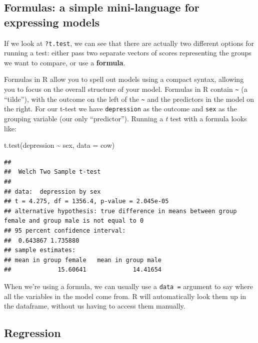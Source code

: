 \documentclass[
]{book}
\newenvironment{Shaded}{\begin{snugshade}}{\end{snugshade}}
\newcommand{\AttributeTok}[1]{\textcolor[rgb]{0.77,0.63,0.00}{#1}}
\newcommand{\FunctionTok}[1]{\textcolor[rgb]{0.00,0.00,0.00}{#1}}
\newcommand{\NormalTok}[1]{#1}
\newcommand{\SpecialCharTok}[1]{\textcolor[rgb]{0.00,0.00,0.00}{#1}}
\begin{document}
\hypertarget{formulas-a-simple-mini-language-for-expressing-models}{%
\subsection{Formulas: a simple mini-language for expressing models}\label{formulas-a-simple-mini-language-for-expressing-models}}

If we look at \texttt{?t.test}, we can see that there are actually
two different options for running a test: either pass two separate
vectors of scores representing the groups we want to compare,
or use a \textbf{formula}.

Formulas in R allow you to spell out models using a compact syntax,
allowing you to focus on the overall structure of your model. Formulas
in R contain \texttt{\textasciitilde{}} (a ``tilde''), with the outcome on the left of the \texttt{\textasciitilde{}} and
the predictors in the model on the right. For our t-test we have
\texttt{depression} as the outcome and \texttt{sex} as the grouping variable (our only
``predictor''). Running a \emph{t} test with a formula looks like:

\begin{Shaded}
\begin{Highlighting}[]
\FunctionTok{t.test}\NormalTok{(depression }\SpecialCharTok{\textasciitilde{}}\NormalTok{ sex, }\AttributeTok{data =}\NormalTok{ cow)}
\end{Highlighting}
\end{Shaded}

\begin{verbatim}
## 
##  Welch Two Sample t-test
## 
## data:  depression by sex
## t = 4.275, df = 1356.4, p-value = 2.045e-05
## alternative hypothesis: true difference in means between group female and group male is not equal to 0
## 95 percent confidence interval:
##  0.643867 1.735880
## sample estimates:
## mean in group female   mean in group male 
##             15.60641             14.41654
\end{verbatim}

When we're using a formula, we can usually use a \texttt{data\ =} argument
to say where all the variables in the model come from. R will automatically
look them up in the dataframe, without us having to access them manually.

\hypertarget{regression}{%
\subsection{Regression}\label{regression}}
\end{document}
